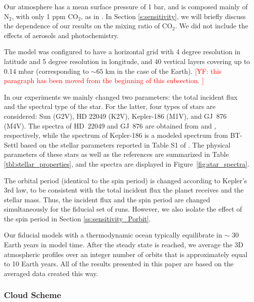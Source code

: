 \documentclass[11pt,numberedappendix,twocolappendix,]{emulateapj}
\def\addYF#1{\textcolor{red}{#1}}
\begin{document}
Our atmosphere has a mean surface pressure of 1 bar, and is composed mainly of N$_2$, with only 1 ppm CO$_2$, as in \citet{Kopparapu2016}. 
In Section \ref{s:sensitivity}, we will briefly discuss the dependence of our results on the mixing ratio of CO$_2$. 
We did not include the effects of aerosols and photochemistry. 

The model was configured to have a horizontal grid with 4 degree resolution in latitude and 5 degree resolution in longitude, and 40 vertical layers covering up to 0.14 mbar (corresponding to $\sim 65$ km in the case of the Earth). \addYF{[YF: this paragraph has been moved from the beginning of this subsection. ]}

In our experiments we mainly changed two parameters: the total incident flux and the spectral type of the star. 
For the latter, four types of stars are considered: 
Sun (G2V), 
HD 22049 (K2V), 
Kepler-186 (M1V), and 
GJ~876 (M4V). 
The spectra of HD~22049 and GJ~876 are obtained from \citet{Segura2003} and \citet{Domagal-Goldman2014}, respectively, 
while the spectrum of Kepler-186 is a modeled spectrum from BT-Settl \citep{Allard2012} based on the stellar parameters reported in Table S1 of \citet{Quintana2014}. 
The physical parameters of these stars as well as the references are summarized in Table \ref{tbl:stellar_properties}, and the spectra are displayed in Figure~\ref{fig:star_spectra}. 

The orbital period (identical to the spin period) is changed according to Kepler's 3rd law, to be consistent with the total incident flux the planet receives and the stellar mass. Thus, the incident flux and the spin period are changed simultaneously for the fiducial set of runs. 
However, we also isolate the effect of the spin period in Section \ref{ss:sensitivity_Porbit}. 

Our fiducial models with a thermodynamic ocean typically equilibrate in $\sim $ 30 Earth years in model time. 
After the steady state is reached, we average the 3D atmospheric profiles over an integer number of orbits that is approximately equal to 10 Earth years. 
All of the results presented in this paper are based on the averaged data created this way. 


\subsubsection{Cloud Scheme}
\end{document}
